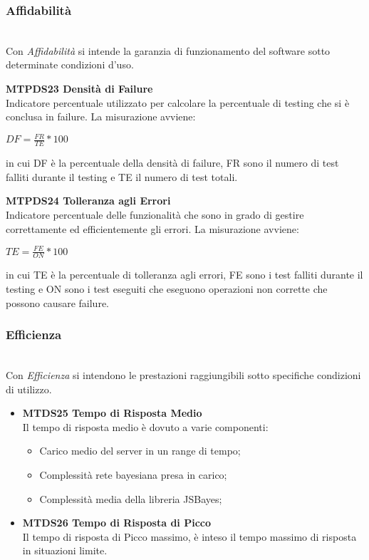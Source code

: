 \subsubsection{Affidabilità}\-\\
Con \textit{Affidabilità} si intende la garanzia di funzionamento del software sotto determinate condizioni d'uso.
\begin{itemize}
	\item \textbf{MTPDS23 Densità di Failure} \-\\
	Indicatore percentuale utilizzato per calcolare la percentuale di testing che si è conclusa in failure. La misurazione avviene: 
	\begin{center}
		\item $ DF = \frac{FR}{TE}*100 $
	\end{center}
	in cui DF è la percentuale della densità di failure, FR sono il numero di test falliti durante il testing e TE il numero di test totali. 
	\item \textbf{MTPDS24 Tolleranza agli Errori} \-\\
	Indicatore percentuale delle funzionalità che sono in grado di gestire correttamente ed efficientemente gli errori. La misurazione avviene: 
	\begin{center}
		\item $ TE = \frac{FE}{ON}*100 $
	\end{center}
	in cui TE è la percentuale di tolleranza agli errori, FE sono i test falliti durante il testing e ON sono i test eseguiti che eseguono operazioni non corrette che possono causare failure. 
\end{itemize}

\subsubsection{Efficienza}\-\\
Con \textit{Efficienza} si intendono le prestazioni raggiungibili sotto specifiche condizioni di utilizzo.
\begin{itemize}
	\item \textbf{MTDS25 Tempo di Risposta Medio}\\
		Il tempo di risposta medio è dovuto a varie componenti: 
		\begin{itemize}
			\item Carico medio del server in un range di tempo;
			\item Complessità rete bayesiana presa in carico; 
			\item Complessità media della libreria JSBayes; 
		\end{itemize} 
	\item \textbf{MTDS26 Tempo di Risposta di Picco}\\
		Il tempo di risposta di Picco massimo, è inteso il tempo massimo di risposta in situazioni limite.
\end{itemize}


